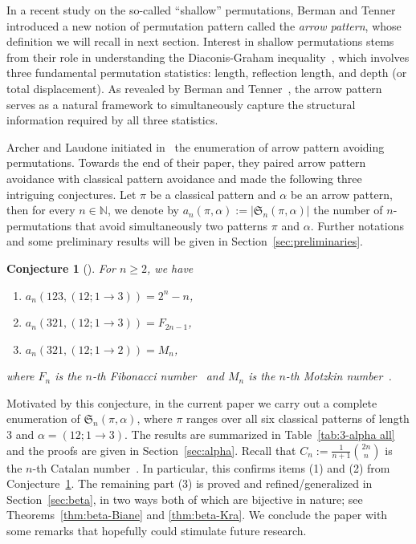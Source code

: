 \documentclass[12pt]{amsart}
\numberwithin{equation}{section}
\theoremstyle{plain}
\newtheorem{conjecture}[theorem]{Conjecture}
\def\N{\mathbb{N}}
\def\fS{\mathfrak{S}}
\begin{document}
	In a recent study on the so-called ``shallow'' permutations, Berman and Tenner~\cite{BT2022} introduced a new notion of permutation pattern called the \emph{arrow pattern}, whose definition we will recall in next section. Interest in shallow permutations stems from their role in understanding the Diaconis-Graham inequality~\cite{DG1977,Woo2022,CM2024,Lau2026}, which involves three fundamental permutation statistics: length, reflection length, and depth (or total displacement). As revealed by Berman and Tenner~\cite{BT2022}, the arrow pattern serves as a natural framework to simultaneously capture the structural information required by all three statistics.
	
	Archer and Laudone initiated in~\cite{AL2026} the enumeration of arrow pattern avoiding permutations. Towards the end of their paper, they paired arrow pattern avoidance with classical pattern avoidance and made the following three intriguing conjectures. Let $\pi$ be a classical pattern and $\alpha$ be an arrow pattern, then for every $n\in \N$, we denote by $a_n(\pi,\alpha):=|\fS_n(\pi,\alpha)|$ the number of $n$-permutations that avoid simultaneously two patterns $\pi$ and $\alpha$. Further notations and some preliminary results will be given in Section~\ref{sec:preliminaries}. 
	
	\begin{conjecture}[{\cite[Conjecture~7.1]{AL2026}}]\label{conj:Archer-Laudone}
		For $n\ge 2$, we have
		\begin{enumerate}
			\item $a_n(123,(12;1\to 3))=2^n-n$,
			\item $a_n(321,(12;1\to 3))=F_{2n-1}$,
			\item $a_n(321,(12;1\to 2))=M_n$,
		\end{enumerate}
		where $F_n$ is the $n$-th Fibonacci number~\cite[A000045]{OEIS} and $M_n$ is the $n$-th Motzkin number~\cite[A001006]{OEIS}.
	\end{conjecture}	

	 Motivated by this conjecture, in the current paper we carry out a complete enumeration of $\fS_n(\pi,\alpha)$, where $\pi$ ranges over all six classical patterns of length 3 and $\alpha=(12;1\to 3)$. The results are summarized in Table~\ref{tab:3-alpha all} and the proofs are given in Section~\ref{sec:alpha}. Recall that $C_n:=\frac{1}{n+1}\binom{2n}{n}$ is the $n$-th Catalan number~\cite[A000108]{OEIS}. In particular, this confirms items (1) and (2) from Conjecture~\ref{conj:Archer-Laudone}. The remaining part (3) is proved and refined/generalized in Section~\ref{sec:beta}, in two ways both of which are bijective in nature; see Theorems~\ref{thm:beta-Biane} and \ref{thm:beta-Kra}. We conclude the paper with some remarks that hopefully could stimulate future research.
\end{document}
